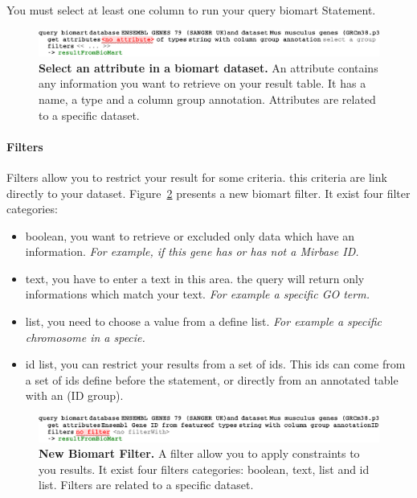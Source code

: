 \begin{remark}
You must select at least one column to run your query biomart Statement.
\end{remark}

 \begin{figure}[h!tbp]
  \centering
  \includegraphics[width=\figWidthWide]{figures/BiomartAttribute.pdf}
\caption[Select an attribute in a biomart dataset.]{\textbf{Select an attribute in a biomart dataset.} An attribute contains any information you want to retrieve on your result table. It has a name, a type and a column group annotation. Attributes are related to a specific dataset.}
\label{fig:attributeBiomart}
\end{figure}
\paragraph{Filters}
Filters allow you to restrict your result for some criteria. this criteria are link directly to your dataset. Figure~\ref{fig:BiomartFilter} presents a new biomart filter. It exist four filter categories: 
\begin{itemize}
\item boolean, you want to retrieve or excluded only data which have an information. \textit{For example, if this gene has or has not a Mirbase ID.}
\item text, you have to enter a text in this area. the query will return only informations which match your text. \textit{For example  a specific GO term.}
\item list,  you need to choose a value from a define list. \textit{For example a specific chromosome in a specie.}
\item id list, you can restrict your results from a set of ids. This ids can come from a set of ids define before the statement, or directly from an annotated table with an (ID group).  
\end{itemize}

 \begin{figure}[h!tbp]
  \centering
  \includegraphics[width=\figWidthWide]{figures/BiomartFilter.pdf}
\caption[New Biomart Filter]{\textbf{New Biomart Filter.} A filter allow you to apply constraints to you results. It exist four filters categories: boolean, text, list and id list. Filters are related to a specific dataset.}
\label{fig:BiomartFilter}
\end{figure}

